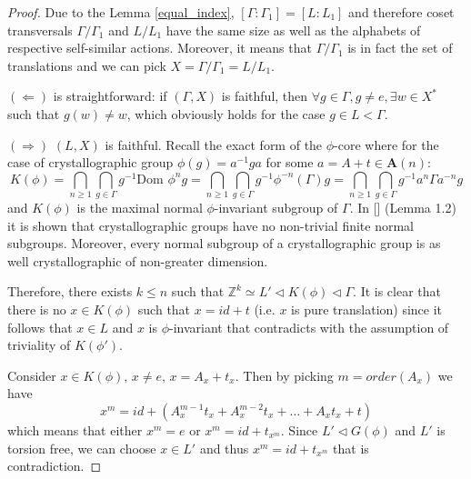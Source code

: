 \documentclass[a4paper,12pt]{amsart}
\theoremstyle{definition}
\newcommand{\Dom}{\text{Dom }}
\begin{document}
	
	\begin{proof}
		Due to the Lemma \ref{equal_index}, $[\Gamma : \Gamma_1] = [L : L_1]$ and therefore coset transversals $\Gamma / \Gamma_1$ and $ L / L_1$ have the same size as well as the alphabets of respective self-similar actions. Moreover, it means that $\Gamma / \Gamma_1$ is in fact the set of translations and we can pick $X = \Gamma / \Gamma_1 = L / L_1$. 
		
		$(\Leftarrow)$ is straightforward: if $(\Gamma, X)$ is faithful, then $\forall g \in \Gamma, g \neq e, \exists w \in X^*$ such that $g(w) \neq w$, which obviously holds for the case $g \in L < \Gamma$.
		
		$(\Rightarrow)$ $(L, X)$ is faithful. Recall the exact form of the $\phi$-core where for the case of crystallographic group $\phi(g) = a^{-1} g a$ for some $a = A + t \in \mathbf{A}(n)$: 
		$$
		K(\phi) = \bigcap_{n\ge1}\bigcap_{g \in \Gamma} g^{-1} \Dom \phi^n g = \bigcap_{n \ge 1}\bigcap_{g \in \Gamma} g^{-1} \phi^{-n}(\Gamma) g = \bigcap_{n \ge 1}\bigcap_{g \in \Gamma} g^{-1} a^n \Gamma a^{-n} g
		$$ 
		and $K(\phi)$ is the maximal normal $\phi$-invariant subgroup of $\Gamma$. In [] (Lemma 1.2) it is shown that crystallographic groups have no non-trivial finite normal subgroups. Moreover, every normal subgroup of a crystallographic group is as well crystallographic of non-greater dimension. 
		
		Therefore, there exists $k \le n$ such that $\mathbb{Z}^k \simeq L' \lhd K(\phi) \lhd \Gamma$. It is clear that there is no $x \in K(\phi)$ such that $x = id + t$ (i.e. $x$ is pure translation) since it follows that $x \in L$ and $x$ is $\phi$-invariant that contradicts with the assumption of triviality of $K(\phi')$.
		
		Consider $x \in K(\phi), \, x\neq e, \, x = A_x + t_x$. Then by picking $m=order(A_x)$ we have 
		$$
		x^m = id + (A^{m-1}_x t_x + A^{m-2}_x t_x + \dots + A_x t_x + t)
		$$
		which means that either $x^m = e$ or $x^m = id + t_{x^m}$. Since $L' \lhd G(\phi)$ and $L'$ is torsion free, we can choose $x \in L'$ and thus $x^m = id + t_{x^m}$ that is contradiction.
	\end{proof}	
	
\end{document}
